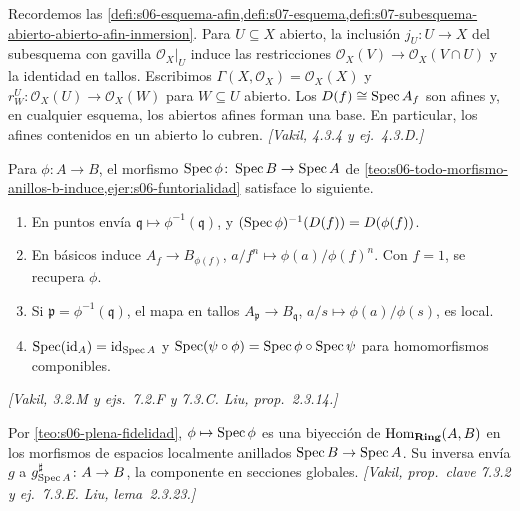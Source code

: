 \begin{defi}
\label{defi:s10-esquema-abiertos}
Recordemos las \cref{defi:s06-esquema-afin,defi:s07-esquema,defi:s07-subesquema-abierto-abierto-afin-inmersion}. Para \(U\subseteq X\) abierto, la inclusión \(j_U\colon U\to X\) del subesquema con gavilla \(\mathcal O_X|_U\) induce las restricciones \(\mathcal O_X(V)\to\mathcal O_X(V\cap U)\) y la identidad en tallos. Escribimos \(\Gamma(X,\mathcal O_X)=\mathcal O_X(X)\) y \(r_W^U\colon\mathcal O_X(U)\to\mathcal O_X(W)\) para \(W\subseteq U\) abierto. Los \(D(f)\cong\operatorname{Spec} A_f\) son afines y, en cualquier esquema, los abiertos afines forman una base. En particular, los afines contenidos en un abierto lo cubren. \emph{[Vakil, 4.3.4 y ej.~4.3.D.]}
\end{defi}

\begin{prop}
\label{prop:s10-morfismo-inducido}
Para \(\phi\colon A\to B\), el morfismo \(\operatorname{Spec}\phi\colon\operatorname{Spec} B\to\operatorname{Spec} A\) de \cref{teo:s06-todo-morfismo-anillos-b-induce,ejer:s06-funtorialidad} satisface lo siguiente.
\begin{enumerate}[label=(\alph*)]
\item En puntos envía \(\mathfrak q\mapsto\phi^{-1}(\mathfrak q)\), y \((\operatorname{Spec}\phi)^{-1}(D(f))=D(\phi(f))\).
\item En básicos induce \(A_f\to B_{\phi(f)}\), \(a/f^n\mapsto\phi(a)/\phi(f)^n\). Con \(f=1\), se recupera \(\phi\).
\item Si \(\mathfrak p=\phi^{-1}(\mathfrak q)\), el mapa en tallos \(A_{\mathfrak p}\to B_{\mathfrak q}\), \(a/s\mapsto\phi(a)/\phi(s)\), es local.
\item \(\operatorname{Spec}(\operatorname{id}_A)=\operatorname{id}_{\operatorname{Spec} A}\) y \(\operatorname{Spec}(\psi\circ\phi)=\operatorname{Spec}\phi\circ\operatorname{Spec}\psi\) para homomorfismos componibles.
\end{enumerate}
\emph{[Vakil, 3.2.M y ejs.~7.2.F y 7.3.C. Liu, prop.~2.3.14.]}
\end{prop}

\begin{teo}
\label{teo:s10-plena-fidelidad}
Por \cref{teo:s06-plena-fidelidad}, \(\phi\mapsto\operatorname{Spec}\phi\) es una biyección de \(\operatorname{Hom}_{\mathbf{Ring}}(A,B)\) en los morfismos de espacios localmente anillados \(\operatorname{Spec} B\to\operatorname{Spec} A\). Su inversa envía \(g\) a \(g_{\operatorname{Spec} A}^\sharp\colon A\to B\), la componente en secciones globales. \emph{[Vakil, prop.~clave 7.3.2 y ej.~7.3.E. Liu, lema~2.3.23.]}
\end{teo}

